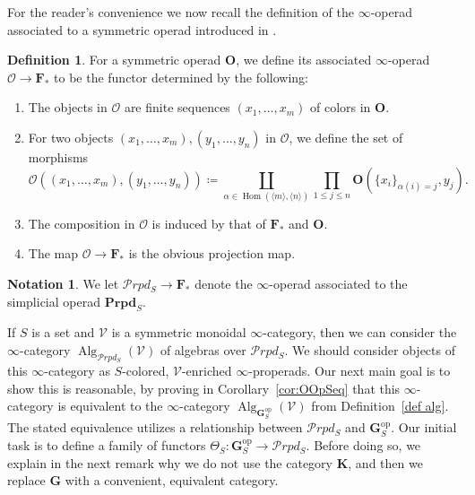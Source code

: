 \documentclass{amsart}
\numberwithin{theorem}{subsection}
\theoremstyle{definition}
\newtheorem{definition}[theorem]{Definition}
\newtheorem{notation}[theorem]{Notation}
\providecommand{\op}{\mathrm{op}}
\newcommand{\xHom}{\operatorname{Hom}}
\newcommand{\finsetskel}{\mathbf{F}}
\newcommand{\pfinsetskel}{\finsetskel_*}
\newcommand{\xAlg}{\operatorname{Alg}}
\newcommand{\xxO}{\mathcal{O}}
\newcommand{\xV}{\mathcal{V}}
\newcommand{\icat}{$\infty$-category}
\newcommand{\bbY}{\mathbf{G}}
\newcommand{\kockgraphs}{\mathbf{K}}
\newcommand{\calproperad}{\mathcal{P}rpd}
\newcommand{\bfproperad}{\mathbf{Prpd}}
\begin{document}
For the reader's convenience we now recall the definition of the $\infty$-operad associated to a symmetric operad introduced in \cite[Construction 2.1.1.7]{ha}.
\begin{definition}
	For a symmetric operad $\mathbf{O}$, we define its associated $\infty$-operad $\xxO\to \pfinsetskel$ to be the functor determined by the following:
	\begin{enumerate}
		\item The objects in $\xxO$ are finite sequences $(x_1,\ldots, x_m)$ of colors in $\mathbf{O}$.
		\item For two objects $(x_1,\ldots, x_m), (y_1,\ldots, y_n)$ in $\xxO$, we define the set of morphisms
		$$\xxO((x_1,\ldots, x_m), (y_1,\ldots, y_n)) \coloneqq \coprod_{\alpha\in \xHom(\langle m\rangle, \langle n\rangle)}\prod_{1\leq j\leq n}\mathbf{O}(\{x_i\}_{\alpha(i)=j}, y_j).$$
		\item The composition in $\xxO$ is induced by that of $\pfinsetskel$ and $\mathbf{O}$.
		\item The map $\xxO\to \pfinsetskel$ is the obvious projection map.
	\end{enumerate}
\end{definition}
\begin{notation}
		We let $\calproperad_S \to \pfinsetskel$ denote the $\infty$-operad associated to the simplicial operad $\bfproperad_S$.
\end{notation}

If $S$ is a set and $\xV$ is a symmetric monoidal $\infty$-category, then we can consider the \icat{} $\xAlg_{\calproperad_S}(\xV)$ of algebras over $\calproperad_S$.
We should consider objects of this \icat{} as $S$-colored, $\xV$-enriched $\infty$-properads.
Our next main goal is to show this is reasonable, by proving in Corollary~\ref{cor:OOpSeq} that this \icat{} is equivalent to the \icat{} $\xAlg_{\bbY_S^\op}(\xV)$ from Definition~\ref{def alg}.
The stated equivalence utilizes a relationship between $\calproperad_S$ and $\bbY_S^\op$.
Our initial task is to define a family of functors $\Theta_S \colon \bbY^\op_S \to \calproperad_S$.
Before doing so, we explain in the next remark why we do not use the category $\kockgraphs$, and then we replace $\bbY$ with a convenient, equivalent category.
\end{document}
